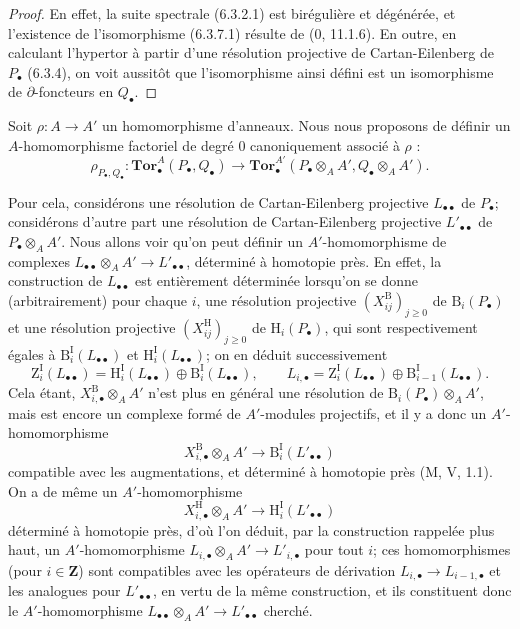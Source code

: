 \begin{proof}
En effet, la suite spectrale (6.3.2.1) est birégulière et dégénérée, et
l'existence de l'isomorphisme (6.3.7.1) résulte de (0, 11.1.6). En outre, en
calculant l'hypertor à partir d'une résolution projective de Cartan-Eilenberg
de $P_\bullet$ (6.3.4), on voit aussitôt que l'isomorphisme ainsi défini est
un isomorphisme de $\partial$-foncteurs en $Q_\bullet$.
\end{proof}
\begin{env}[6.3.8]
Soit $\rho:A\to A'$ un homomorphisme d'anneaux. Nous nous proposons de
définir un $A$-homomorphisme factoriel de degré 0 canoniquement associé à
$\rho$ :
\[
  \rho_{P_\bullet,Q_\bullet}:
  \mathbf{Tor}_\bullet^A(P_\bullet,Q_\bullet)
  \longrightarrow
  \mathbf{Tor}_\bullet^{A'}
  (P_\bullet\otimes_A A',Q_\bullet\otimes_A A').
  \tag{6.3.8.1}\label{III.6.3.8.1.fr}
\]

Pour cela, considérons une résolution de Cartan-Eilenberg projective
$L_{\bullet\bullet}$ de $P_\bullet$; considérons d'autre part une résolution
de Cartan-Eilenberg projective $L'_{\bullet\bullet}$ de
$P_\bullet\otimes_A A'$. Nous allons voir qu'on peut définir un
$A'$-homomorphisme de complexes
$L_{\bullet\bullet}\otimes_A A'\to L'_{\bullet\bullet}$, déterminé à
homotopie près. En effet, la construction de $L_{\bullet\bullet}$ est
entièrement déterminée lorsqu'on se donne (arbitrairement) pour chaque $i$,
une résolution projective $(X_{ij}^{\mathrm B})_{j\geqslant0}$ de
$\mathrm B_i(P_\bullet)$ et une résolution projective
$(X_{ij}^{\mathrm H})_{j\geqslant0}$ de $\mathrm H_i(P_\bullet)$, qui sont
respectivement égales à $\mathrm B_i^{\mathrm I}(L_{\bullet\bullet})$ et
$\mathrm H_i^{\mathrm I}(L_{\bullet\bullet})$; on en déduit successivement
\[
  \mathrm Z_i^{\mathrm I}(L_{\bullet\bullet})
  =\mathrm H_i^{\mathrm I}(L_{\bullet\bullet})
   \oplus\mathrm B_i^{\mathrm I}(L_{\bullet\bullet}),
  \qquad
  L_{i,\bullet}=\mathrm Z_i^{\mathrm I}(L_{\bullet\bullet})
   \oplus\mathrm B_{i-1}^{\mathrm I}(L_{\bullet\bullet}).
\]
Cela étant, $X_{i,\bullet}^{\mathrm B}\otimes_A A'$ n'est plus en général
une résolution de $\mathrm B_i(P_\bullet)\otimes_A A'$, mais est encore un
complexe formé de $A'$-modules projectifs, et il y a donc un
$A'$-homomorphisme
\[
  X_{i,\bullet}^{\mathrm B}\otimes_A A'
  \longrightarrow \mathrm B_i^{\mathrm I}(L'_{\bullet\bullet})
\]
compatible avec les augmentations, et déterminé à homotopie près
(M, V, 1.1). On a de même un $A'$-homomorphisme
\[
  X_{i,\bullet}^{\mathrm H}\otimes_A A'
  \longrightarrow \mathrm H_i^{\mathrm I}(L'_{\bullet\bullet})
\]
déterminé à homotopie près, d'où l'on déduit, par la construction rappelée
plus haut, un $A'$-homomorphisme
$L_{i,\bullet}\otimes_A A'\to L'_{i,\bullet}$ pour tout $i$; ces
homomorphismes (pour $i\in\mathbf Z$) sont compatibles avec les opérateurs de
dérivation $L_{i,\bullet}\to L_{i-1,\bullet}$ et les analogues pour
$L'_{\bullet\bullet}$, en vertu de la même construction, et ils constituent
donc le $A'$-homomorphisme
$L_{\bullet\bullet}\otimes_A A'\to L'_{\bullet\bullet}$ cherché.


\end{env}

